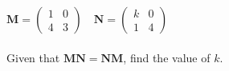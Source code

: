 \newpage 
\question
$\mathbf{M}=\left(\begin{array}{ll}1 & 0 \\ 4 & 3\end{array}\right) \quad \mathbf{N}=\left(\begin{array}{cc}k & 0 \\ 1 & 4\end{array}\right)$
\\  \\
Given that $\mathbf{M N}=\mathbf{N M}$, find the value of $k$.\\ \vspace{300pt}
{}